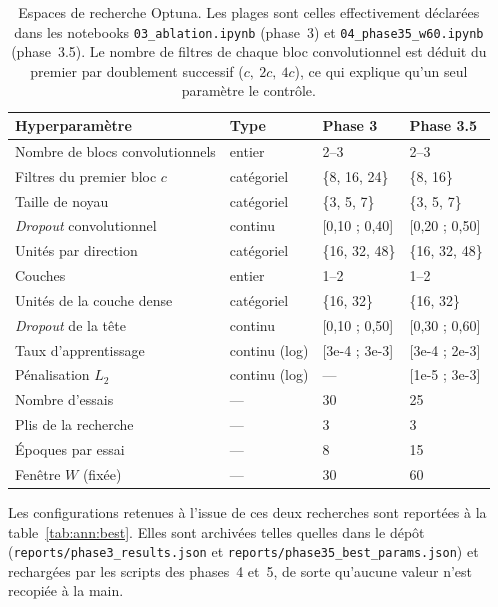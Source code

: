 \begin{table}[H]
  \centering
  \caption{Espaces de recherche Optuna. Les plages sont celles effectivement
  déclarées dans les notebooks \texttt{03\_ablation.ipynb} (phase~3) et
  \texttt{04\_phase35\_w60.ipynb} (phase~3.5). Le nombre de filtres de chaque
  bloc convolutionnel est déduit du premier par doublement successif
  (\(c,\ 2c,\ 4c\)), ce qui explique qu'un seul paramètre le contrôle.}
  \label{tab:ann:optuna}
  \begin{tabular}{llll}
    \toprule
    \textbf{Hyperparamètre} & \textbf{Type} & \textbf{Phase 3} & \textbf{Phase 3.5} \\
    \midrule
    Nombre de blocs convolutionnels   & entier      & 2--3            & 2--3 \\
    Filtres du premier bloc \(c\)     & catégoriel  & \{8, 16, 24\}   & \{8, 16\} \\
    Taille de noyau                   & catégoriel  & \{3, 5, 7\}     & \{3, 5, 7\} \\
    \textit{Dropout} convolutionnel   & continu     & [0,10 ; 0,40]   & [0,20 ; 0,50] \\
    Unités \LSTM{} par direction      & catégoriel  & \{16, 32, 48\}  & \{16, 32, 48\} \\
    Couches \LSTM{}                   & entier      & 1--2            & 1--2 \\
    Unités de la couche dense         & catégoriel  & \{16, 32\}      & \{16, 32\} \\
    \textit{Dropout} de la tête       & continu     & [0,10 ; 0,50]   & [0,30 ; 0,60] \\
    Taux d'apprentissage              & continu (log) & [3e-4 ; 3e-3] & [3e-4 ; 2e-3] \\
    Pénalisation \(L_2\)              & continu (log) & ---           & [1e-5 ; 3e-3] \\
    \midrule
    Nombre d'essais                   & ---         & 30              & 25 \\
    Plis de la recherche              & ---         & 3               & 3 \\
    Époques par essai                 & ---         & 8               & 15 \\
    Fenêtre \(W\) (fixée)             & ---         & 30              & 60 \\
    \bottomrule
  \end{tabular}
\end{table}

Les configurations retenues à l'issue de ces deux recherches sont reportées à la
table~\ref{tab:ann:best}. Elles sont archivées telles quelles dans le dépôt
(\texttt{reports/phase3\_results.json} et
\texttt{reports/phase35\_best\_params.json}) et rechargées par les scripts des
phases~4 et~5, de sorte qu'aucune valeur n'est recopiée à la main.

